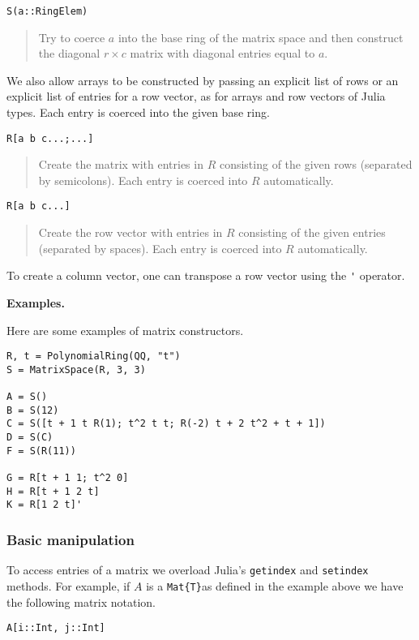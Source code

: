 \documentclass[a4paper,10pt]{article}
\newcommand{\code}{\lstinline}
\newcommand{\desc}[1]{\vspace{-3mm}\begin{quote}#1\end{quote}}
\begin{document}
\begin{lstlisting}
S(a::RingElem)
\end{lstlisting}

\desc{Try to coerce $a$ into the base ring of the matrix space and then construct
the diagonal $r\times c$ matrix with diagonal entries equal to $a$.}

We also allow arrays to be constructed by passing an explicit list of rows or an
explicit list of entries for a row vector, as for arrays and row vectors of
Julia types. Each entry is coerced into the given base ring.

\begin{lstlisting}
R[a b c...;...]
\end{lstlisting}

\desc{Create the matrix with entries in $R$ consisting of the given rows
(separated by semicolons). Each entry is coerced into $R$ automatically.}

\begin{lstlisting}
R[a b c...]
\end{lstlisting}

\desc{Create the row vector with entries in $R$ consisting of the given
entries (separated by spaces). Each entry is coerced into $R$ automatically.}

To create a column vector, one can transpose a row vector using the \code{'}
operator.

\textbf{Examples.}

Here are some examples of matrix constructors.

\begin{lstlisting}
R, t = PolynomialRing(QQ, "t")
S = MatrixSpace(R, 3, 3)

A = S()
B = S(12)
C = S([t + 1 t R(1); t^2 t t; R(-2) t + 2 t^2 + t + 1])
D = S(C)
F = S(R(11))

G = R[t + 1 1; t^2 0]
H = R[t + 1 2 t]
K = R[1 2 t]'
\end{lstlisting}

\subsubsection{Basic manipulation}

To access entries of a matrix we overload Julia's \code{getindex} and \code{setindex}
methods. For example, if $A$ is a \code|Mat{T}|as defined in the example above
we have the following matrix notation.

\begin{lstlisting}
A[i::Int, j::Int]
\end{lstlisting}
\end{document}
